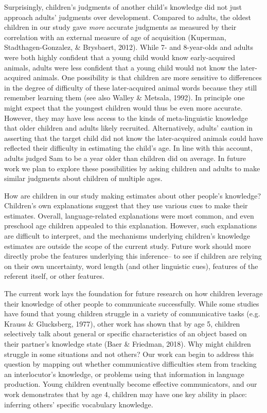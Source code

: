 \documentclass[10pt, letterpaper]{article}
\begin{document}
Surprisingly, children's judgments of another child's knowledge did not
just approach adults' judgments over development. Compared to adults,
the oldest children in our study gave \emph{more} accurate judgments as
measured by their correlation with an external measure of age of
acquisition (Kuperman, Stadthagen-Gonzalez, \& Brysbaert, 2012). While
7- and 8-year-olds and adults were both highly confident that a young
child would know early-acquired animals, adults were less confident that
a young child would not know the later-acquired animals. One possibility
is that children are more sensitive to differences in the degree of
difficulty of these later-acquired animal words because they still
remember learning them (see also Walley \& Metsala, 1992). In principle
one might expect that the youngest children would thus be even more
accurate. However, they may have less access to the kinds of
meta-linguistic knowledge that older children and adults likely
recruited. Alternatively, adults' caution in asserting that the target
child did not know the later-acquired animals could have reflected their
difficulty in estimating the child's age. In line with this account,
adults judged Sam to be a year older than children did on average. In
future work we plan to explore these possibilities by asking children
and adults to make similar judgments about children of multiple ages.

How are children in our study making estimates about other people's
knowledge? Children's own explanations suggest that they use various
cues to make their estimates. Overall, language-related explanations
were most common, and even preschool age children appealed to this
explanation. However, such explanations are difficult to interpret, and
the mechanisms underlying children's knowledge estimates are outside the
scope of the current study. Future work should more directly probe the
features underlying this inference-- to see if children are relying on
their own uncertainty, word length (and other linguistic cues), features
of the referent itself, or other features.

The current work lays the foundation for future research on how children
leverage their knowledge of other people to communicate successfully.
While some studies have found that young children struggle in a variety
of communicative tasks (e.g. Krauss \& Glucksberg, 1977), other work has
shown that by age 5, children selectively talk about general or specific
characteristics of an object based on their partner's knowledge state
(Baer \& Friedman, 2018). Why might children struggle in some situations
and not others? Our work can begin to address this question by mapping
out whether communicative difficulties stem from tracking an
interlocutor's knowledge, or problems using that information in language
production. Young children eventually become effective communicators,
and our work demonstrates that by age 4, children may have one key
ability in place: inferring others' specific vocabulary knowledge.
\end{document}
